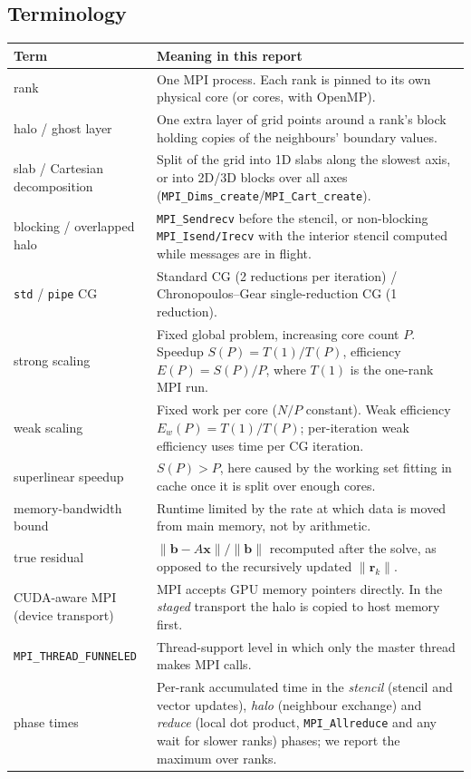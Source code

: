 \documentclass[11pt,a4paper]{article}
\begin{document}
\subsection{Terminology}
\begin{table}[H]
\centering\small
\begin{tabularx}{\linewidth}{>{\raggedright\arraybackslash}p{3.6cm}X}
\toprule
Term & Meaning in this report\\
\midrule
rank & One MPI process. Each rank is pinned to its own physical core (or cores, with OpenMP).\\
halo / ghost layer & One extra layer of grid points around a rank's block holding copies of the neighbours' boundary values.\\
slab / Cartesian decomposition & Split of the grid into 1D slabs along the slowest axis, or into 2D/3D blocks over all axes (\texttt{MPI\_Dims\_create}/\texttt{MPI\_Cart\_create}).\\
blocking / overlapped halo & \texttt{MPI\_Sendrecv} before the stencil, or non-blocking \texttt{MPI\_Isend/Irecv} with the interior stencil computed while messages are in flight.\\
\texttt{std} / \texttt{pipe} CG & Standard CG (2 reductions per iteration) / Chronopoulos--Gear single-reduction CG (1 reduction).\\
strong scaling & Fixed global problem, increasing core count $P$. Speedup $S(P)=T(1)/T(P)$, efficiency $E(P)=S(P)/P$, where $T(1)$ is the one-rank MPI run.\\
weak scaling & Fixed work per core ($N/P$ constant). Weak efficiency $E_w(P)=T(1)/T(P)$; per-iteration weak efficiency uses time per CG iteration.\\
superlinear speedup & $S(P)>P$, here caused by the working set fitting in cache once it is split over enough cores.\\
memory-bandwidth bound & Runtime limited by the rate at which data is moved from main memory, not by arithmetic.\\
true residual & $\|\mathbf b-A\mathbf x\|/\|\mathbf b\|$ recomputed after the solve, as opposed to the recursively updated $\|\mathbf r_k\|$.\\
CUDA-aware MPI (device transport) & MPI accepts GPU memory pointers directly. In the \emph{staged} transport the halo is copied to host memory first.\\
\texttt{MPI\_THREAD\_FUNNELED} & Thread-support level in which only the master thread makes MPI calls.\\
phase times & Per-rank accumulated time in the \emph{stencil} (stencil and vector updates), \emph{halo} (neighbour exchange) and \emph{reduce} (local dot product, \texttt{MPI\_Allreduce} and any wait for slower ranks) phases; we report the maximum over ranks.\\
\bottomrule
\end{tabularx}
\end{table}
\end{document}
